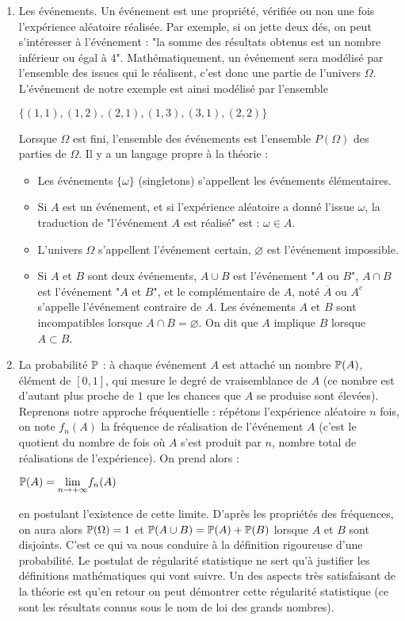 \documentclass[12pt,a4paper]{report}
\begin{document}
\begin{enumerate}
	\item Les événements. Un événement est une propriété, vérifiée ou non une fois l'expérience aléatoire réalisée. Par exemple, si on jette deux dés, on peut 
	s'intéresser à l'événement : "la somme des résultats obtenus est un nombre inférieur ou égal à 4". Mathématiquement, un événement sera modélisé par l'ensemble des 
	issues qui le réalisent, c'est donc une partie de l'univers $\Omega$. L'événement de notre exemple est ainsi modélisé par l'ensemble 
	\begin{center}
	$\{(1,1),(1,2),(2,1),(1,3),(3,1),(2,2)\}$
	\end{center}
	Lorsque $\Omega$ est fini, l'ensemble des événements est l'ensemble $P(\Omega)$ des parties de $\Omega$. Il y a un langage propre à la théorie :
	\begin{itemize}
		\item Les événements $\{\omega\}$ (singletons) s'appellent les événements élémentaires.
		\item Si $A$ est un événement, et si l'expérience aléatoire a donné l'issue $\omega$, la traduction de "l'événement $A$ est réalisé" est : $\omega \in A$. 
		\item L'univers $\Omega$ s'appellent l'événement certain, $\varnothing$ est l'événement impossible.
		\item Si $A$ et $B$ sont deux événements, $A \cup B$ est l'événement "$A$ ou $B$", $A \cap B$ est l'événement "$A$ et $B$", et le complémentaire de $A$, noté $\overline{A}$ ou $A^c$ s'appelle l'événement contraire de $A$. Les événements $A$ et $B$ sont incompatibles lorsque $A \cap B = \varnothing$. On dit que $A$ implique $B$ lorsque $A \subset B$.
	\end{itemize}
	
	\item La probabilité $\mathbb{P}$ : à chaque événement $A$ est attaché un nombre $\mathbb{P}(A)$, élément de $[0,1]$, qui mesure le degré de vraisemblance de $A$ (ce nombre est 
	d'autant plus proche de $1$ que les chances que $A$ se produise sont élevées). \\
	
	Reprenons notre approche fréquentielle : répétons l'expérience aléatoire $n$ fois, on note $f_n(A)$ la fréquence de réalisation de l'événement $A$ (c'est le 
	quotient du nombre de fois où $A$ s'est produit par $n$, nombre total de réalisations de l'expérience). On prend alors :
	\begin{center}
	$\mathbb{P}(A) = \underset{n \to +\infty}{\lim} f_n(A)$
	\end{center}
	en postulant l'existence de cette limite. D'après les propriétés des fréquences, on aura alors $\mathbb{P}(\Omega) = 1$ et $\mathbb{P}(A \cup B) = \mathbb{P}(A)+\mathbb{P}(B)$ lorsque $A$ et $B$ 
	sont disjoints. C'est ce qui va nous conduire à la définition rigoureuse d'une probabilité. Le postulat de régularité statistique ne sert qu'à justifier les 
	définitions mathématiques qui vont suivre. Un des aspects très satisfaisant de la théorie est qu'en retour on peut démontrer cette régularité statistique (ce sont 
	les résultats connus sous le nom de loi des grands nombres).
\end{enumerate}
\end{document}
